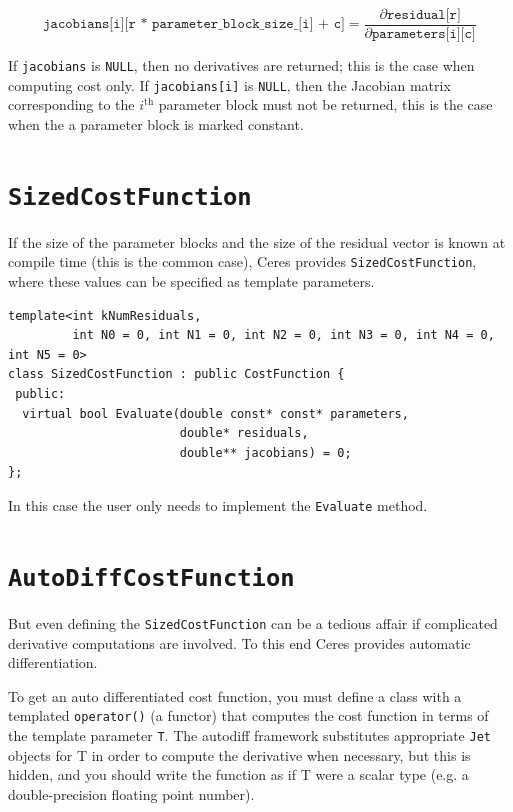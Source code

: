 \begin{equation}
\texttt{jacobians[i][r * parameter\_block\_size\_[i] + c]} =
\frac{\partial \texttt{residual[r]}}{\partial \texttt{parameters[i][c]}}
\end{equation}

If \texttt{jacobians} is \texttt{NULL}, then no derivatives are returned; this is the case when computing cost only. If \texttt{jacobians[i]} is \texttt{NULL}, then the Jacobian matrix corresponding to the $i^{\textrm{th}}$ parameter block must not be returned, this is the case when the a parameter block is marked constant.

\section{\texttt{SizedCostFunction}}
If the size of the parameter blocks and the size of the residual vector is known at compile time (this is the common case), Ceres provides \texttt{SizedCostFunction}, where these values can be specified as template parameters.
\begin{verbatim}
template<int kNumResiduals,
         int N0 = 0, int N1 = 0, int N2 = 0, int N3 = 0, int N4 = 0, int N5 = 0>
class SizedCostFunction : public CostFunction {
 public:
  virtual bool Evaluate(double const* const* parameters,
                        double* residuals,
                        double** jacobians) = 0;
};
\end{verbatim}
In this case the user only needs to implement the \texttt{Evaluate} method.

\section{\texttt{AutoDiffCostFunction}}
But even defining the \texttt{SizedCostFunction} can be a tedious affair if complicated derivative computations are involved. To this end Ceres provides automatic differentiation.

To get an auto differentiated cost function, you must define a class with a
 templated \texttt{operator()} (a functor) that computes the cost function in terms of
 the template parameter \texttt{T}. The autodiff framework substitutes appropriate
 \texttt{Jet} objects for T in order to compute the derivative when necessary, but
 this is hidden, and you should write the function as if T were a scalar type
 (e.g. a double-precision floating point number).

